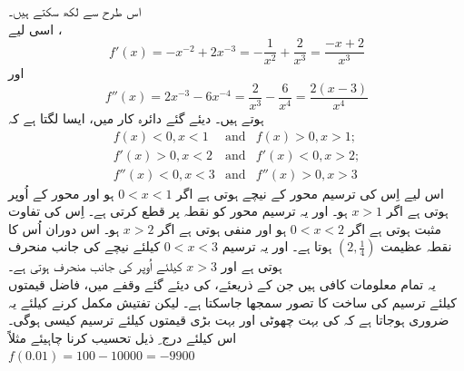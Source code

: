        اس طرح سے  لکھ سکتے ہیں۔\\
اسی لیے ،
\[f'(x)=-x^{-2}+2x^{-3}=- \frac{1}{x^2}+\frac{2}{x^3}=\frac{-x+2}{x^3}\]
اور  
\[f''(x)=2x^{-3}-6x^{-4} =\frac{2}{x^3}-\frac{6}{x^4} =\frac{2(x-3)}{x^4}\]
  ہوتے ہیں۔ 
دیئے گئے دائرہ کار میں، ایسا لگتا ہے کہ                      
 \[
\begin{array}{lcl}
f(x)<0,x<1 & \text{and} & f(x)>0,x>1; \\
 f'(x)>0,x<2  & \text{and} & f'(x)<0,x>2; \\
 f''(x)<0,x<3  & \text{and} &  f''(x)>0,x>3 
\end{array}
\]    
اس لیے اِس کی ترسیم   محور کے نیچے ہوتی ہے اگر  
\( 0<x<1\)
 ہو اور    محور کے اُوپر ہوتی ہے اگر   
 \(x>1\)
  ہو۔ اور یہ ترسیم   محور کو نقطہ   پر قطع کرتی ہے۔ اِس کی تفاوت مثبت ہوتی ہے اگر   
  \(0<x<2\)
  ہو اور منفی ہوتی ہے اگر 
  \(x>2\)
     ہو۔ اس دوران اُس کا نقطہ عظیمت  
     \((2,\frac{1}{4})\)
       ہوتا ہے۔  اور یہ ترسیم   
       \(0<x<3\)
       کیلئے نیچے کی جانب منحرف ہوتی ہے اور 
       \(x>3\)
         کیلئے اُوپر کی جانب منحرف ہوتی ہے۔ \\
	یہ تمام معلومات کافی ہیں جن کے ذریعئے،  کی دیئے گئے وقفے میں،   فاضل قیمتوں  کیلئے  ترسیم کی ساخت کا تصور سمجھا جاسکتا ہے۔ لیکن تفتیش مکمل کرنے کیلئے یہ ضروری ہوجاتا ہے کہ   کی بہت چھوٹی اور بہت بڑی قیمتوں کیلئے ترسیم کیسی ہوگی۔ اس کیلئے درج  ِ ذیل تحسیب کرنا چاہیئے مثلاً \\
	  \(f(0.01)=100-10000=-9900\)


